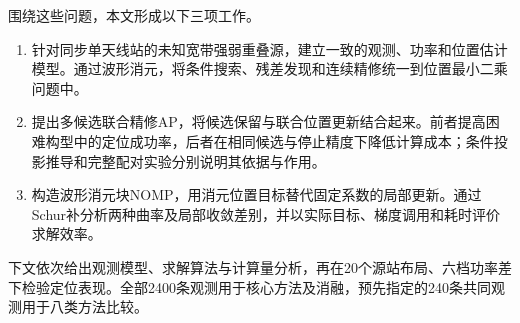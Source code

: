 围绕这些问题，本文形成以下三项工作。
\begin{enumerate}
  \item 针对同步单天线站的未知宽带强弱重叠源，建立一致的观测、功率和位置估计模型。通过波形消元，将条件搜索、残差发现和连续精修统一到位置最小二乘问题中。
  \item 提出多候选联合精修AP，将候选保留与联合位置更新结合起来。前者提高困难构型中的定位成功率，后者在相同候选与停止精度下降低计算成本；条件投影推导和完整配对实验分别说明其依据与作用。
  \item 构造波形消元块NOMP，用消元位置目标替代固定系数的局部更新。通过Schur补分析两种曲率及局部收敛差别，并以实际目标、梯度调用和耗时评价求解效率。
\end{enumerate}

下文依次给出观测模型、求解算法与计算量分析，再在20个源站布局、六档功率差下检验定位表现。全部2400条观测用于核心方法及消融，预先指定的240条共同观测用于八类方法比较。
